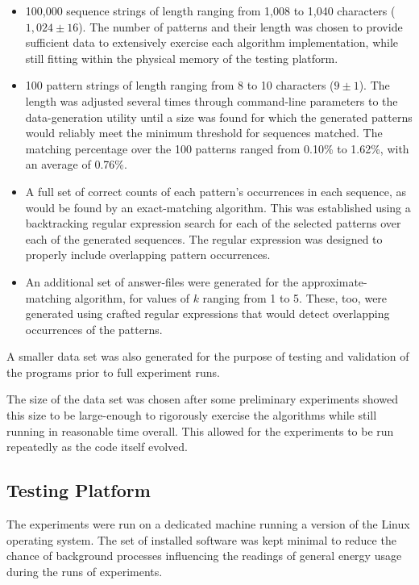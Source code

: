 \begin{itemize}
\item 100,000 sequence strings of length ranging from 1,008 to 1,040 characters ($1,024 \pm 16$). The number of patterns and their length was chosen to provide sufficient data to extensively exercise each algorithm implementation, while still fitting within the physical memory of the testing platform.
\item 100 pattern strings of length ranging from 8 to 10 characters ($9 \pm 1$). The length was adjusted several times through command-line parameters to the data-generation utility until a size was found for which the generated patterns would reliably meet the minimum threshold for sequences matched. The matching percentage over the 100 patterns ranged from 0.10\% to 1.62\%, with an average of 0.76\%.
\item A full set of correct counts of each pattern's occurrences in each sequence, as would be found by an exact-matching algorithm. This was established using a backtracking regular expression search for each of the selected patterns over each of the generated sequences. The regular expression was designed to properly include overlapping pattern occurrences.
\item An additional set of answer-files were generated for the approximate-matching algorithm, for values of $k$ ranging from 1 to 5. These, too, were generated using crafted regular expressions that would detect overlapping occurrences of the patterns.
\end{itemize}

A smaller data set was also generated for the purpose of testing and validation of the programs prior to full experiment runs.

The size of the data set was chosen after some preliminary experiments showed this size to be large-enough to rigorously exercise the algorithms while still running in reasonable time overall. This allowed for the experiments to be run repeatedly as the code itself evolved.

\subsection{Testing Platform}

The experiments were run on a dedicated machine running a version of the Linux operating system. The set of installed software was kept minimal to reduce the chance of background processes influencing the readings of general energy usage during the runs of experiments.

